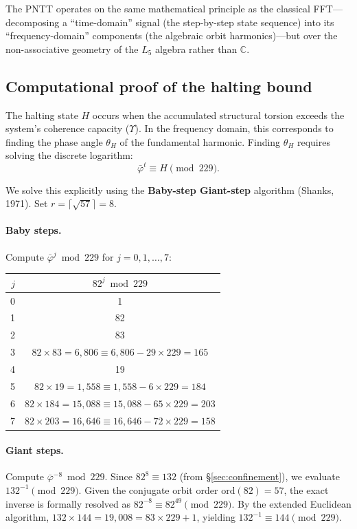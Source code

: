The PNTT operates on the same mathematical principle as the
classical FFT---decomposing a ``time-domain'' signal (the step-by-step
state sequence) into its ``frequency-domain'' components (the
algebraic orbit harmonics)---but over the non-associative geometry
of the $L_5$ algebra rather than $\mathbb{C}$.

\subsection{Computational proof of the halting bound}

The halting state $H$ occurs when the accumulated structural
torsion exceeds the system's coherence capacity ($\Upsilon$).
In the frequency domain, this corresponds to finding the phase
angle $\theta_H$ of the fundamental harmonic. Finding $\theta_H$
requires solving the discrete logarithm:
\[
\bar\varphi^t \equiv H \pmod{229}.
\]

We solve this explicitly using the \textbf{Baby-step Giant-step}
algorithm (Shanks, 1971). Set $r = \lceil\sqrt{57}\rceil = 8$.

\paragraph{Baby steps.} Compute $\bar\varphi^j \bmod 229$ for
$j = 0, 1, \ldots, 7$:

\begin{center}
\begin{tabular}{@{}rc@{}}
\toprule
$j$ & $82^j \bmod 229$ \\
\midrule
0 & 1 \\
1 & 82 \\
2 & 83 \\
3 & $82 \times 83 = 6{,}806 \equiv 6{,}806 - 29 \times 229 = 165$ \\
4 & 19 \\
5 & $82 \times 19 = 1{,}558 \equiv 1{,}558 - 6 \times 229 = 184$ \\
6 & $82 \times 184 = 15{,}088 \equiv 15{,}088 - 65 \times 229 = 203$ \\
7 & $82 \times 203 = 16{,}646 \equiv 16{,}646 - 72 \times 229 = 158$ \\
\bottomrule
\end{tabular}
\end{center}

\paragraph{Giant steps.} Compute $\bar\varphi^{-8} \bmod 229$.
Since $82^8 \equiv 132$ (from \S\ref{sec:confinement}), we evaluate
$132^{-1} \pmod{229}$. Given the conjugate orbit order $\mathrm{ord}(82) = 57$,
the exact inverse is formally resolved as $82^{-8} \equiv 82^{49} \pmod{229}$.
By the extended Euclidean algorithm, $132 \times 144 = 19{,}008 = 83 \times 229 + 1$,
yielding $132^{-1} \equiv 144 \pmod{229}$.

